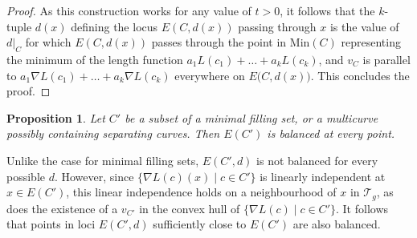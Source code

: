 \documentclass[pdftex]{sigma}
\numberwithin{equation}{section}
\newtheorem{Proposition}[Theorem]{Proposition}
\begin{document}
\begin{proof}
As this construction works for any value of $t>0$, it follows that the $k$-tuple $d(x)$ defining the locus $E(C,d(x))$ passing through $x$ is the value of $d|_{C}$ for which $E(C, d(x))$ passes through the point in $\mathrm{Min}(C)$ representing the minimum of the length function $a_{1}L(c_{1})+\dots+a_{k} L(c_{k})$, and $v_{C}$ is parallel to $a_{1}\nabla L(c_{1})+\dots+a_{k}\nabla L(c_{k})$ everywhere on $E\big(C,d(x)\big)$. This concludes the proof.
\end{proof}

\begin{Proposition}
\label{balancedlemnonfilling}
Let $C'$ be a subset of a minimal filling set, or a multicurve possibly containing separating curves. Then $E(C')$ is balanced at every point.
\end{Proposition}

\begin{Remark}
\label{balancednearby}
Unlike the case for minimal filling sets, $E(C',d)$ is not balanced for every possible $d$. However, since $\{\nabla L(c)(x) \mid c\in C'\}$ is linearly independent at $x\in E(C')$, this linear independence holds on a neighbourhood of $x$ in $\mathcal{T}_{g}$, as does the existence of a $v_{C'}$ in the convex hull of $\{\nabla L(c) \mid c\in C'\}$. It follows that points in loci $E(C',d)$ sufficiently close to $E(C')$ are also balanced.
\end{Remark}
\end{document}
